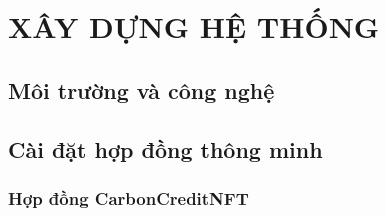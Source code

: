 
\chapter{XÂY DỰNG HỆ THỐNG}
\label{chap:xaydung}



\section{Môi trường và công nghệ}
\label{sec:moitruong}

\BangCongNghe

\HinhCauTrucMa

\section{Cài đặt hợp đồng thông minh}
\label{sec:caidat-hopdong}

\subsection{Hợp đồng CarbonCreditNFT}
\label{subsec:caidat-nft}

